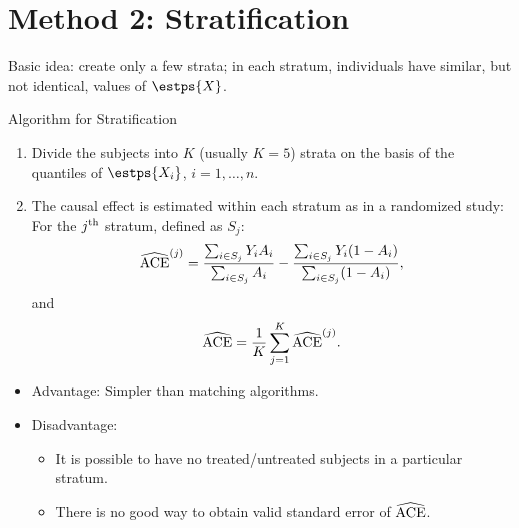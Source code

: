 \section{Method 2: Stratification}
Basic idea: create only a few strata; in each stratum,
individuals have similar, but not identical, values of $ \estps{X} $.
\begin{Regular}{Algorithm for Stratification}
      \begin{enumerate}[1.]
            \item Divide the subjects into $ K $ (usually $ K=5 $) strata on the basis of the quantiles
                  of $ \estps{X_i} $, $ i=1,\ldots,n $.
            \item The causal effect is estimated within each stratum as in a
                  randomized study:
                  For the $ j\textsuperscript{th} $ stratum, defined as $ S_j $:
                  \[ \widehat{\text{ACE}}^{(j)}=\frac{\sum_{i\in S_j}Y_i A_i}{\sum_{i\in S_j}A_i}-\frac{\sum_{i\in S_j}Y_i(1-A_i)}{\sum_{i\in S_j}(1-A_i)}, \]
                  and
                  \[ \widehat{\text{ACE}}=\frac{1}{K}\sum_{j=1}^{K}\widehat{\text{ACE}}^{(j)}. \]
      \end{enumerate}
\end{Regular}
\begin{itemize}
      \item Advantage: Simpler than matching algorithms.
      \item Disadvantage:
            \begin{itemize}
                  \item It is possible to have no treated/untreated subjects in a
                        particular stratum.
                  \item There is no good way to obtain valid standard error of $ \widehat{\text{ACE}} $.
            \end{itemize}
\end{itemize}
